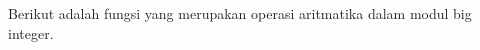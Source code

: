 
\label{sec:bn_func_all}

Berikut adalah fungsi yang merupakan operasi aritmatika dalam modul big integer.

